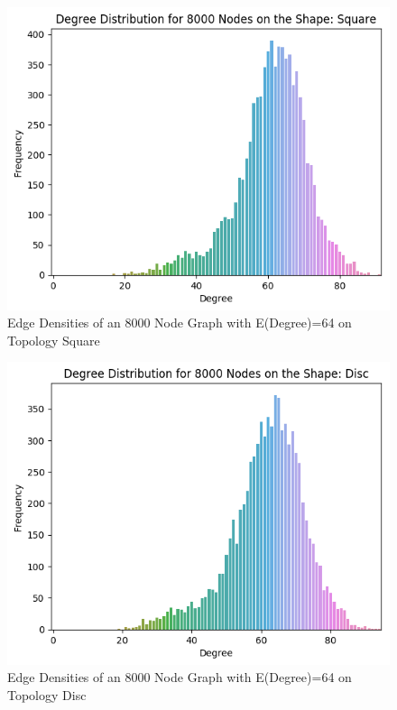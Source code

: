 \documentclass{article}
\begin{document}
    \begin{figure}[H]
      \label{square_edge_density}
      \includegraphics[width=1 \textwidth]{square/edge_density/8000_64.png}
      \caption{Edge Densities of an 8000 Node Graph with E(Degree)=64 on Topology Square}
    \end{figure}

    \begin{figure}[H]
      \label{disc_edge_density}
      \includegraphics[width=1 \textwidth]{disc/edge_density/8000_64.png}
      \caption{Edge Densities of an 8000 Node Graph with E(Degree)=64 on Topology Disc}
    \end{figure}
\end{document}
